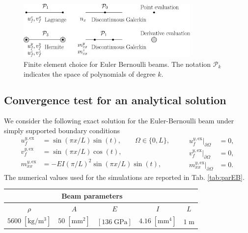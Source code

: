 \documentclass{svjour3}                     %
\newcommand{\secondRev}[1]{\textcolor{blue!80!black}{#1}}
\begin{document}
\begin{figure}[t]
	\centering
	\includegraphics[width=0.8\textwidth]{fe_beam.eps} \hspace{.5cm}
	\caption{Finite element choice for Euler Bernoulli beams. The notation $\mathcal{P}_k$ indicates the space of polynomials of degree $k$.}
	\label{fig:fe_beam}
\end{figure}

\secondRev{
\subsection{Convergence test for an analytical solution}
We consider the following exact solution for the Euler-Bernoulli beam under simply supported boundary conditions
\begin{equation*}
\begin{aligned}
u_f^{y, {\text{ex}}} &= \sin(\pi x/ L)\sin(t), \qquad \Omega \in \{0, L\}, \\
v_f^{y, {\text{ex}}} &= \sin\left({\pi x}/{L}\right)\cos(t), \\
m_{xx}^{y, \text{ex}} &= - EI \left({\pi}/{L}\right)^2 \sin\left({\pi x}/{L}\right)\sin(t), \\
\end{aligned} \qquad 
\begin{aligned}
u_f^{y, {\text{ex}}} \vert_{\partial\Omega} &= 0, \\
v_f^{y, {\text{ex}}} \vert_{\partial\Omega} &= 0, \\
m_{xx}^{y, \text{ex}} \vert_{\partial\Omega} &= 0.
\end{aligned}
\end{equation*}
The numerical values used for the simulations are reported in Tab. \ref{tab:parEB}.
\begin{table}[tbh]
	\centering
	\begin{tabular}{ccccc}
		\hline 
		\multicolumn{4}{c}{Beam parameters} \\ 
		\hline 
		$\rho$ & $A$ & $E$ & $I$ & $L$\\
		$5600\; [\textrm{kg}/\textrm{m}^3]$ & $50\; [\textrm{mm}^2]$ &  $[136 \; \textrm{GPa}]$ & $4.16\; [\textrm{mm}^4]$ & $1\; \textrm{m}$ \\ 

\end{tabular}
\end{table}}
\end{document}
